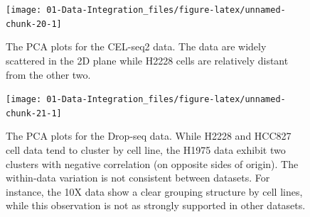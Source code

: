 \documentclass[]{book}
\newenvironment{Shaded}{\begin{snugshade}}{\end{snugshade}}
\newcommand{\CommentTok}[1]{\textcolor[rgb]{0.56,0.35,0.01}{\textit{#1}}}
\newcommand{\DataTypeTok}[1]{\textcolor[rgb]{0.13,0.29,0.53}{#1}}
\newcommand{\KeywordTok}[1]{\textcolor[rgb]{0.13,0.29,0.53}{\textbf{#1}}}
\newcommand{\NormalTok}[1]{#1}
\newcommand{\OperatorTok}[1]{\textcolor[rgb]{0.81,0.36,0.00}{\textbf{#1}}}
\newcommand{\StringTok}[1]{\textcolor[rgb]{0.31,0.60,0.02}{#1}}
\theoremstyle{definition}
\theoremstyle{definition}
\theoremstyle{definition}
\theoremstyle{remark}
\begin{document}
\begin{Shaded}
\end{Shaded}

\begin{figure}[ht]

{\centering \texttt{[image: 01-Data-Integration\_files/figure-latex/unnamed-chunk-20-1]} 

}

\caption{The PCA plots for the CEL-seq2 data. The data are widely scattered in the 2D plane while H2228 cells are relatively distant from the other two.}\label{fig:unnamed-chunk-20}
\end{figure}

\begin{Shaded}
\end{Shaded}

\begin{figure}[ht]

{\centering \texttt{[image: 01-Data-Integration\_files/figure-latex/unnamed-chunk-21-1]} 

}

\caption{The PCA plots for the Drop-seq data. While H2228 and HCC827 cell data tend to cluster by cell line, the H1975 data exhibit two clusters with negative correlation (on opposite sides of origin). The within-data variation is not consistent between datasets. For instance, the 10X data show a clear grouping structure by cell lines, while this observation is not as strongly supported in other datasets. }\label{fig:unnamed-chunk-21}
\end{figure}
\end{document}
